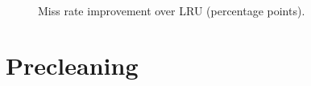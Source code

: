 \begin{figure}[htb]
\begin{center}
\ 
\caption{Miss rate improvement over LRU (percentage points).}
\label{f:hawkeye_pw_miss_rate}
\end{center}
\end{figure}

\section{Precleaning}
